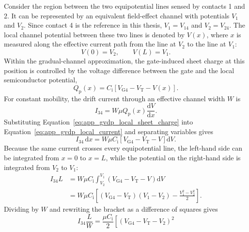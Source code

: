 \begin{appendix}
Consider the region between the two equipotential lines sensed by contacts 1 and
2. It can be represented by an equivalent field-effect channel with potentials
$V_1$ and $V_2$. Since contact 4 is the reference in this thesis,
$V_1=V_{14}$ and $V_2=V_{24}$. The local channel potential between these two
lines is denoted by $V(x)$, where $x$ is measured along the effective current
path from the line at $V_2$ to the line at $V_1$:
\begin{equation}
    V(0)=V_2,
    \qquad
    V(L)=V_1.
    \label{eq:app_gvdp_boundary_potentials}
\end{equation}
Within the gradual-channel approximation, the gate-induced sheet charge at this
position is controlled by the voltage difference between the gate and the local
semiconductor potential,
\begin{equation}
    Q_\mathrm{p}(x)
    =C_\mathrm{i}\left[V_\mathrm{G4}-V_\mathrm{T}-V(x)\right].
    \label{eq:app_gvdp_local_sheet_charge}
\end{equation}
For constant mobility, the drift current through an effective channel width $W$
is
\begin{equation}
    I_{34}
    =W\mu Q_\mathrm{p}(x)\frac{\mathrm{d}V}{\mathrm{d}x}.
    \label{eq:app_gvdp_local_current}
\end{equation}
Substituting Equation~\eqref{eq:app_gvdp_local_sheet_charge} into
Equation~\eqref{eq:app_gvdp_local_current} and separating variables gives
\begin{equation}
    I_{34}\,\mathrm{d}x
    =W\mu C_\mathrm{i}\left[V_\mathrm{G4}-V_\mathrm{T}-V\right]
    \mathrm{d}V.
    \label{eq:app_gvdp_separated_current}
\end{equation}
Because the same current crosses every equipotential line, the left-hand side can
be integrated from $x=0$ to $x=L$, while the potential on the right-hand side is
integrated from $V_2$ to $V_1$:
\begin{align}
    I_{34}L
    &=W\mu C_\mathrm{i}
    \int_{V_2}^{V_1}
    \left(V_\mathrm{G4}-V_\mathrm{T}-V\right)\mathrm{d}V \\
    &=W\mu C_\mathrm{i}
    \left[
        \left(V_\mathrm{G4}-V_\mathrm{T}\right)(V_1-V_2)
        -\frac{V_1^2-V_2^2}{2}
    \right].
    \label{eq:app_gvdp_integrated_current}
\end{align}
Dividing by $W$ and rewriting the bracket as a difference of squares gives
\begin{equation}
    I_{34}\frac{L}{W}
    =\frac{\mu C_\mathrm{i}}{2}
    \left[
    \left(V_\mathrm{G4}-V_\mathrm{T}-V_2\right)^2

\end{equation}
\end{appendix}
